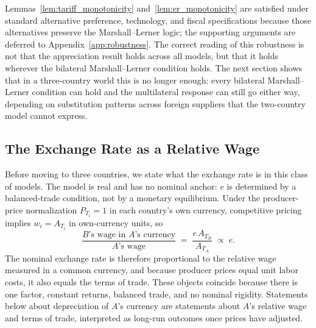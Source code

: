 \documentclass[11pt]{article}
\theoremstyle{plain}
\theoremstyle{remark}
\numberwithin{lemma}{section}
\numberwithin{proposition}{section}
\numberwithin{corollary}{section}
\newcommand{\rev}[1]{{\color{RevBlue}#1}}
\newenvironment{revblock}{\par\begingroup\color{RevBlue}}{\endgroup\par}
\begin{document}
\rev{Lemmas~\ref{lem:tariff_monotonicity} and~\ref{lem:er_monotonicity} are satisfied under standard alternative preference, technology, and fiscal specifications because those alternatives preserve the Marshall--Lerner logic; the supporting arguments are deferred to Appendix~\ref{app:robustness}. The correct reading of this robustness is not that the appreciation result holds across all models, but that it holds wherever the bilateral Marshall--Lerner condition holds. The next section shows that in a three-country world this is no longer enough: every bilateral Marshall--Lerner condition can hold and the multilateral response can still go either way, depending on substitution patterns across foreign suppliers that the two-country model cannot express.}

\begin{revblock}
\subsection{The Exchange Rate as a Relative Wage}
\label{sec:relwage}

Before moving to three countries, we state what the exchange rate is in this class of models. The model is real and has no nominal anchor: $e$ is determined by a balanced-trade condition, not by a monetary equilibrium. Under the producer-price normalization $P_{T_i} = 1$ in each country's own currency, competitive pricing implies $w_i = A_{T_i}$ in own-currency units, so
\[
\frac{\text{$B$'s wage in $A$'s currency}}{\text{$A$'s wage}} \;=\; \frac{e\, A_{T_B}}{A_{T_A}} \;\propto\; e .
\]
The nominal exchange rate is therefore proportional to the relative wage measured in a common currency, and because producer prices equal unit labor costs, it also equals the terms of trade. These objects coincide because there is one factor, constant returns, balanced trade, and no nominal rigidity. Statements below about depreciation of $A$'s currency are statements about $A$'s relative wage and terms of trade, interpreted as long-run outcomes once prices have adjusted.


\end{revblock}
\end{document}
